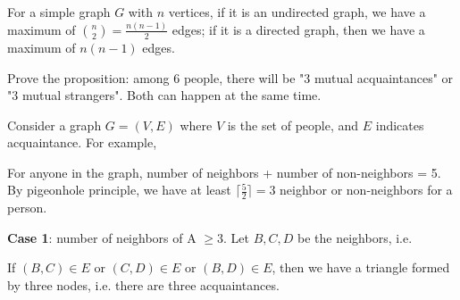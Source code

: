 For a simple graph \(G\) with \(n\) vertices, if it is an undirected graph, we have a maximum of \(\binom{n}{2} = \frac{n(n-1)}{2}\) edges; if it is a directed graph, then we have a maximum of \(n(n-1)\) edges. 

\begin{eg}
  Prove the proposition: among 6 people, there will be "3 mutual acquaintances" or "3 mutual strangers". Both can happen at the same time. 

  Consider a graph \(G = (V, E)\) where \(V\) is the set of people, and \(E\) indicates acquaintance. For example,
  \begin{figure}[H]
    \centering
  \end{figure}
  For anyone in the graph, number of neighbors + number of non-neighbors = 5.
  By pigeonhole principle, we have at least \(\lceil \frac{5}{2} \rceil = 3\) neighbor or non-neighbors for a person.  

  \textbf{Case 1}: number of neighbors of A \(\geq 3\). Let \(B, C, D\) be the neighbors, i.e. 
  \begin{figure}[H]
    \centering
  \end{figure}
  If \((B, C) \in E\) or \((C, D) \in E\) or \((B, D) \in E\), then we have a triangle formed by three nodes, i.e. there are three acquaintances. 


\end{eg}
